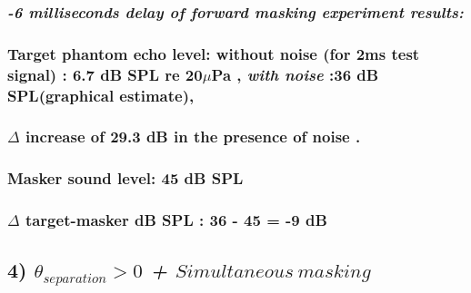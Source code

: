 \documentclass[11pt]{article}
\begin{document}
\hypertarget{milliseconds-delay-of-forward-masking-experiment-results}{%
\subsubsection{\texorpdfstring{\emph{-6 milliseconds delay of forward
masking experiment
results:}}{-6 milliseconds delay of forward masking experiment results:}}\label{milliseconds-delay-of-forward-masking-experiment-results}}

\hypertarget{target-phantom-echo-level-without-noise-for-2ms-test-signal-6.7-db-spl-re-20mupa-with-noise-36-db-splgraphical-estimate}{%
\subsubsection{\texorpdfstring{Target phantom echo level: without noise
(for 2ms test signal) : 6.7 dB SPL re 20\(\mu\)Pa , \emph{with noise}
:36 dB SPL(graphical
estimate),}{Target phantom echo level: without noise (for 2ms test signal) : 6.7 dB SPL re 20\textbackslash{}muPa , with noise :36 dB SPL(graphical estimate),}}\label{target-phantom-echo-level-without-noise-for-2ms-test-signal-6.7-db-spl-re-20mupa-with-noise-36-db-splgraphical-estimate}}

\hypertarget{delta-increase-of-29.3-db-in-the-presence-of-noise-.}{%
\subsubsection{\texorpdfstring{\(\Delta\) increase of 29.3 dB in the
presence of noise
.}{\textbackslash{}Delta increase of 29.3 dB in the presence of noise .}}\label{delta-increase-of-29.3-db-in-the-presence-of-noise-.}}

\hypertarget{masker-sound-level-45-db-spl}{%
\subsubsection{Masker sound level: 45 dB
SPL}\label{masker-sound-level-45-db-spl}}

\hypertarget{delta-target-masker-db-spl-36---45--9-db}{%
\subsubsection{\texorpdfstring{\(\Delta\) target-masker dB SPL : 36 - 45
= -9
dB}{\textbackslash{}Delta target-masker dB SPL : 36 - 45 = -9 dB}}\label{delta-target-masker-db-spl-36---45--9-db}}

    \hypertarget{theta_separation-0-simultaneous-masking}{%
\subsection{\texorpdfstring{4) \emph{\(\theta_{separation} >0\) +
\(Simultaneous\ masking\)}}{4) \textbackslash{}theta\_\{separation\} \textgreater{}0 + Simultaneous\textbackslash{} masking}}\label{theta_separation-0-simultaneous-masking}}
\end{document}
